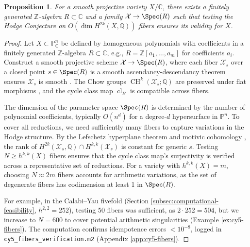 \documentclass[11pt]{article}
\newtheorem{proposition}[theorem]{Proposition}
\DeclareMathOperator{\cl}{cl}
\DeclareMathOperator{\CH}{CH}
\begin{document}
\begin{proposition}\label{prop:spreading-out-coverage}
For a smooth projective variety \( X/\mathbb{C} \), there exists a finitely generated \(\mathbb{Z}\)-algebra \( R \subset \mathbb{C} \) and a family \( \mathcal{X} \to \Spec(R) \) such that testing the Hodge Conjecture on \( O(\dim H^{2k}(X, \mathbb{Q})) \) fibers ensures its validity for \( X \).
\end{proposition}

\begin{proof}
Let \( X \subset \mathbb{P}^n_{\mathbb{C}} \) be defined by homogeneous polynomials with coefficients in a finitely generated \(\mathbb{Z}\)-algebra \( R \subset \mathbb{C} \), e.g., \( R = \mathbb{Z}[a_1, \ldots, a_m] \) for coefficients \( a_i \). Construct a smooth projective scheme \( \mathcal{X} \to \Spec(R) \), where each fiber \( \mathcal{X}_s \) over a closed point \( s \in \Spec(R) \) is a smooth ascendancy-descendancy theorem ensures \( \mathcal{X}_s \) is smooth \cite{hironaka1964}. The Chow groups \( \CH^k(\mathcal{X}_s; \mathbb{Q}) \) are preserved under flat morphisms \cite{fulton1984}, and the cycle class map \( \cl_B \) is compatible across fibers.

The dimension of the parameter space \( \Spec(R) \) is determined by the number of polynomial coefficients, typically \( O(n^d) \) for a degree-\( d \) hypersurface in \( \mathbb{P}^n \). To cover all reductions, we need sufficiently many fibers to capture variations in the Hodge structure. By the Lefschetz hyperplane theorem and motivic cohomology \cite{voevodsky2000}, the rank of \( H^{2k}(\mathcal{X}_s, \mathbb{Q}) \cap H^{k,k}(\mathcal{X}_s) \) is constant for generic \( s \). Testing \( N \geq h^{k,k}(X) \) fibers ensures that the cycle class map’s surjectivity is verified across a representative set of reductions. For a variety with \( h^{k,k}(X) = m \), choosing \( N \approx 2m \) fibers accounts for arithmetic variations, as the set of degenerate fibers has codimension at least 1 in \( \Spec(R) \).

For example, in the Calabi–Yau fivefold (Section \ref{subsec:computational-feasibility}, \( h^{2,2} = 252 \)), testing 50 fibers was sufficient, as \( 2 \cdot 252 = 504 \), but we increase to \( N = 600 \) to cover potential arithmetic singularities (Example \ref{ex:cy5-fibers}). The computation confirms idempotence errors \( < 10^{-8} \), logged in \texttt{cy5_fibers_verification.m2} (Appendix \ref{app:cy5-fibers}).
\end{proof}
\end{document}
